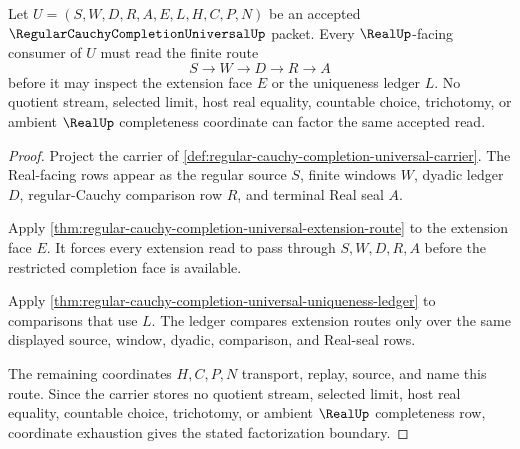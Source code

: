 \begin{theorem}
\label{thm:regular-cauchy-completion-universal-real-seal-factorization}
Let $U=(S,W,D,R,A,E,L,H,C,P,N)$ be an accepted $\RegularCauchyCompletionUniversalUp$ packet. Every $\RealUp$-facing consumer of $U$ must read the finite route
$$
S \longrightarrow W \longrightarrow D \longrightarrow R \longrightarrow A
$$
before it may inspect the extension face $E$ or the uniqueness ledger $L$. No quotient stream, selected limit, host real equality, countable choice, trichotomy, or ambient $\RealUp$ completeness coordinate can factor the same accepted read.
\end{theorem}
\begin{proof}
Project the carrier of \autoref{def:regular-cauchy-completion-universal-carrier}. The Real-facing rows appear as the regular source $S$, finite windows $W$, dyadic ledger $D$, regular-Cauchy comparison row $R$, and terminal Real seal $A$.

Apply \autoref{thm:regular-cauchy-completion-universal-extension-route} to the extension face $E$. It forces every extension read to pass through $S,W,D,R,A$ before the restricted completion face is available.

Apply \autoref{thm:regular-cauchy-completion-universal-uniqueness-ledger} to comparisons that use $L$. The ledger compares extension routes only over the same displayed source, window, dyadic, comparison, and Real-seal rows.

The remaining coordinates $H,C,P,N$ transport, replay, source, and name this route. Since the carrier stores no quotient stream, selected limit, host real equality, countable choice, trichotomy, or ambient $\RealUp$ completeness row, coordinate exhaustion gives the stated factorization boundary.
\end{proof}

